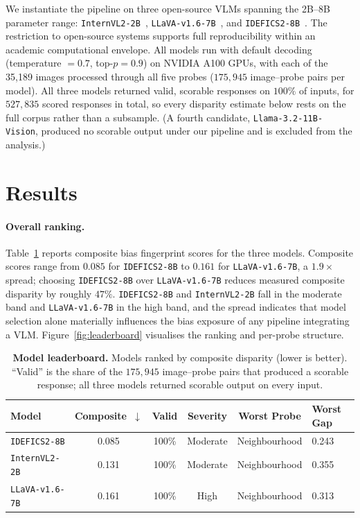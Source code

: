 \documentclass[letterpaper]{article} %
\newcommand{\model}[1]{\texttt{#1}}
\begin{document}
We instantiate the pipeline on three open-source VLMs spanning the 2B--8B parameter range: \model{InternVL2-2B}~\citep{chen2023internvl}, \model{LLaVA-v1.6-7B}~\citep{liu2023llava}, and \model{IDEFICS2-8B}~\citep{laurencon2024idefics2}. The restriction to open-source systems supports full reproducibility within an academic computational envelope. All models run with default decoding (temperature $= 0.7$, top-$p = 0.9$) on NVIDIA A100 GPUs, with each of the 35{,}189 images processed through all five probes ($175{,}945$ image--probe pairs per model). All three models returned valid, scorable responses on $100\%$ of inputs, for $527{,}835$ scored responses in total, so every disparity estimate below rests on the full corpus rather than a subsample. (A fourth candidate, \model{Llama-3.2-11B-Vision}, produced no scorable output under our pipeline and is excluded from the analysis.)

\section{Results}
\label{sec:results}

\paragraph{Overall ranking.}
Table~\ref{tab:leaderboard} reports composite bias fingerprint scores for the three models. Composite scores range from $0.085$ for \model{IDEFICS2-8B} to $0.161$ for \model{LLaVA-v1.6-7B}, a $1.9\times$ spread; choosing \model{IDEFICS2-8B} over \model{LLaVA-v1.6-7B} reduces measured composite disparity by roughly $47\%$. \model{IDEFICS2-8B} and \model{InternVL2-2B} fall in the moderate band and \model{LLaVA-v1.6-7B} in the high band, and the spread indicates that model selection alone materially influences the bias exposure of any pipeline integrating a VLM. Figure~\ref{fig:leaderboard} visualises the ranking and per-probe structure.

\begin{table}[t]
\centering
\caption{\textbf{Model leaderboard.} Models ranked by composite disparity (lower is better). ``Valid'' is the share of the $175{,}945$ image--probe pairs that produced a scorable response; all three models returned scorable output on every input.}
\label{tab:leaderboard}
\small
\begin{tabular}{lccccl}
\toprule
\textbf{Model} & \textbf{Composite~$\downarrow$} & \textbf{Valid} & \textbf{Severity} & \textbf{Worst Probe} & \textbf{Worst Gap} \\
\midrule
\model{IDEFICS2-8B} & 0.085 & 100\% & Moderate & Neighbourhood & 0.243 \\
\model{InternVL2-2B} & 0.131 & 100\% & Moderate & Neighbourhood & 0.355 \\
\model{LLaVA-v1.6-7B} & 0.161 & 100\% & High & Neighbourhood & 0.313 \\
\bottomrule
\end{tabular}
\end{table}
\end{document}
